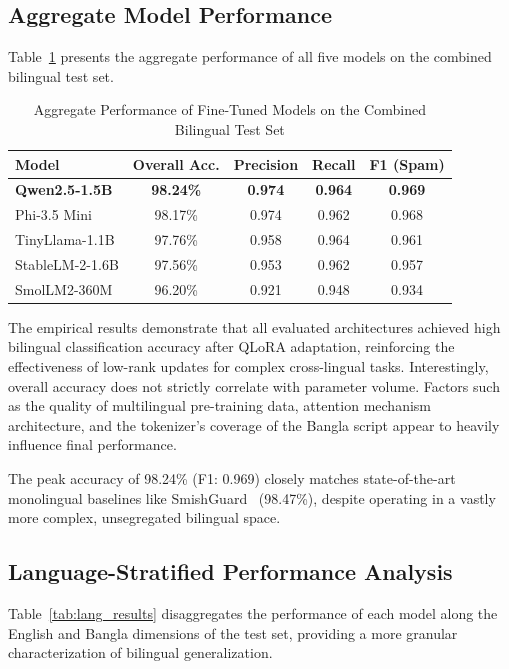 \documentclass[journal]{IEEEtran}
\begin{document}
\subsection{Aggregate Model Performance}

Table~\ref{tab:aggregate_results} presents the aggregate performance of all five models on the combined bilingual test set.

\begin{table}[htbp]
\caption{Aggregate Performance of Fine-Tuned Models on the Combined Bilingual Test Set}
\label{tab:aggregate_results}
\centering
\begin{tabular}{lcccc}
\toprule
\textbf{Model} & \textbf{Overall Acc.} & \textbf{Precision} & \textbf{Recall} & \textbf{F1 (Spam)} \\
\midrule
\rowcolor{gray!20} \textbf{Qwen2.5-1.5B} & \textbf{98.24\%} & \textbf{0.974} & \textbf{0.964} & \textbf{0.969} \\
Phi-3.5 Mini & 98.17\% & 0.974 & 0.962 & 0.968 \\
TinyLlama-1.1B & 97.76\% & 0.958 & 0.964 & 0.961 \\
StableLM-2-1.6B & 97.56\% & 0.953 & 0.962 & 0.957 \\
SmolLM2-360M & 96.20\% & 0.921 & 0.948 & 0.934 \\
\bottomrule
\end{tabular}
\end{table}



The empirical results demonstrate that all evaluated architectures achieved high bilingual classification accuracy after QLoRA adaptation, reinforcing the effectiveness of low-rank updates for complex cross-lingual tasks. Interestingly, overall accuracy does not strictly correlate with parameter volume. Factors such as the quality of multilingual pre-training data, attention mechanism architecture, and the tokenizer's coverage of the Bangla script appear to heavily influence final performance.

The peak accuracy of 98.24\% (F1: 0.969) closely matches state-of-the-art monolingual baselines like SmishGuard~\cite{ref6} (98.47\%), despite operating in a vastly more complex, unsegregated bilingual space.

\subsection{Language-Stratified Performance Analysis}

Table~\ref{tab:lang_results} disaggregates the performance of each model along the English
and Bangla dimensions of the test set, providing a more granular
characterization of bilingual generalization.
\end{document}
